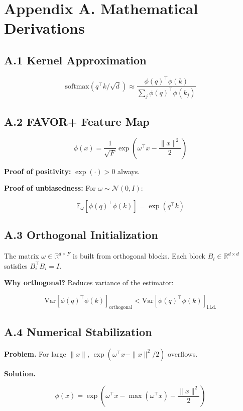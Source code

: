 
\section{Appendix A. Mathematical Derivations}

\subsection{A.1 Kernel Approximation}

\[
\text{softmax}(q^\top k / \sqrt{d}) \approx \frac{\phi(q)^\top \phi(k)}{\sum_j \phi(q)^\top \phi(k_j)}
\tag{A.1}
\]

\subsection{A.2 FAVOR+ Feature Map}

\[
\phi(x) = \frac{1}{\sqrt{F}} \exp\!\left(\omega^\top x - \frac{\|x\|^2}{2}\right)
\tag{A.2}
\]

\textbf{Proof of positivity:} $\exp(\cdot) > 0$ always.

\textbf{Proof of unbiasedness:} For $\omega \sim \mathcal{N}(0, I)$:

\[
\mathbb{E}_\omega[\phi(q)^\top \phi(k)] = \exp(q^\top k)
\tag{A.3}
\]

\subsection{A.3 Orthogonal Initialization}

The matrix $\omega \in \mathbb{R}^{d \times F}$ is built from orthogonal 
blocks. Each block $B_i \in \mathbb{R}^{d \times d}$ satisfies 
$B_i^\top B_i = I$.

\textbf{Why orthogonal?} Reduces variance of the estimator:

\[
\text{Var}[\phi(q)^\top \phi(k)]_{\text{orthogonal}} < \text{Var}[\phi(q)^\top \phi(k)]_{\text{i.i.d.}}
\tag{A.4}
\]

\subsection{A.4 Numerical Stabilization}

\textbf{Problem.} For large $\|x\|$, $\exp(\omega^\top x - \|x\|^2/2)$ overflows.

\textbf{Solution.}

\[
\phi(x) = \exp\!\left(\omega^\top x - \max(\omega^\top x) - \frac{\|x\|^2}{2}\right)
\tag{A.5}
\]

